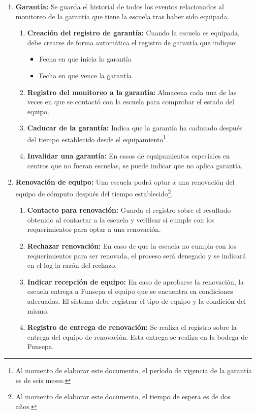 \documentclass[11pt]{report}
\newcommand{\requisito}[2]{\textbf{#1:} #2}
\begin{document}
\begin{enumerate}[leftmargin=0.8cm]
		\item \requisito{Garantía}{Se guarda el historial de todos los eventos relacionados al monitoreo de la garantía que tiene la escuela tras haber sido equipada.}
		\begin{enumerate}
			\item \requisito{Creación del registro de garantía}{Cuando la escuela es equipada, debe crearse de forma automática el registro de garantía que indique:
				\begin{itemize}
					\item Fecha en que inicia la garantía
					\item Fecha en que vence la garantía
				\end{itemize}
			}
			\item \requisito{Registro del monitoreo a la garantía}{Almacena cada una de las veces en que se contactó con la escuela para comprobar el estado del equipo.}
			\item \requisito{Caducar de la garantía}{Indica que la garantía ha caducado después del tiempo establecido desde el equipamiento\footnote{Al momento de elaborar este documento, el período de vigencia de la garantía es de seis meses.}.}
			\item \requisito{Invalidar una garantía}{En casos de equipamientos especiales en centros que no fueran escuelas, se puede indicar que no aplica garantía.}
		\end{enumerate}
		
		\item \requisito{Renovación de equipo}{Una escuela podrá optar a una renovación del equipo de cómputo después del tiempo establecido\footnote{Al momento de elaborar este documento, el tiempo de espera es de dos años.}.}
		\begin{enumerate}
			\item \requisito{Contacto para renovación}{Guarda el registro sobre el resultado obtenido al contactar a la escuela y verificar si cumple con los requerimientos para optar a una renovación.}
			\item \requisito{Rechazar renovación}{En caso de que la escuela no cumpla con los requerimientos para ser renovada, el proceso será denegado y se indicará en el log la razón del rechazo.}
			\item \requisito{Indicar recepción de equipo}{En caso de aprobarse la renovación, la escuela entrega a Funsepa el equipo que se encuentra en condiciones adecuadas. El sistema debe registrar el tipo de equipo y la condición del mismo.}
			\item \requisito{Registro de entrega de renovación}{Se realiza el registro sobre la entrega del equipo de renovación. Esta entrega se realiza en la bodega de Funsepa.}
		\end{enumerate}
		
	\end{enumerate}
	
\end{document}
